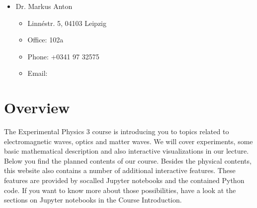 \documentclass[letterpaper,10pt,english]{sphinxmanual}
\begin{document}
\begin{DUlineblock}{0em}
\item[] 
\end{DUlineblock}
\begin{itemize}
\item {} 
\sphinxAtStartPar
Dr. Markus Anton
\begin{itemize}
\item {} 
\sphinxAtStartPar
Linnéstr. 5, 04103 Leipzig

\item {} 
\sphinxAtStartPar
Office: 102a

\item {} 
\sphinxAtStartPar
Phone: +0341 97 32575

\item {} 
\sphinxAtStartPar
Email: 

\end{itemize}

\end{itemize}


\chapter{Overview}
\label{\detokenize{lectures/Intro/overview:overview}}\label{\detokenize{lectures/Intro/overview::doc}}
\sphinxAtStartPar
The Experimental Physics 3 course is introducing you to topics related to electromagnetic waves, optics and matter waves.
We will cover experiments, some basic mathematical description and also interactive visualizations in our lecture. Below
you find the planned contents of our course. Besides the physical contents, this website also contains a number of additional
interactive features. These features are provided by so\sphinxhyphen{}called Jupyter notebooks and the contained Python code. If you want to know more about those possibilities, have a look at the sections on Jupyter notebooks in the Course Introduction.



\begin{DUlineblock}{0em}
\item[] 
\end{DUlineblock}
\end{document}
